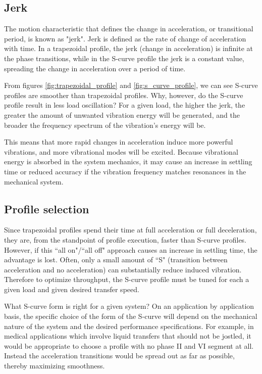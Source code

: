 \subsection{Jerk}

The motion characteristic that defines the change in acceleration, or
transitional period, is known as "jerk". Jerk is defined as the rate of change
of acceleration with time. In a trapezoidal profile, the jerk (change in
acceleration) is infinite at the phase transitions, while in the S-curve profile
the jerk is a constant value, spreading the change in acceleration over a period
of time.

From figures \ref{fig:trapezoidal_profile} and \ref{fig:s_curve_profile}, we can
see S-curve profiles are smoother than trapezoidal profiles. Why, however, do
the S-curve profile result in less load oscillation? For a given load, the
higher the jerk, the greater the amount of unwanted vibration energy will be
generated, and the broader the frequency spectrum of the vibration's energy will
be.

This means that more rapid changes in acceleration induce more powerful
vibrations, and more vibrational modes will be excited. Because vibrational
energy is absorbed in the system mechanics, it may cause an increase in settling
time or reduced accuracy if the vibration frequency matches resonances in the
mechanical system.

\subsection{Profile selection}

Since trapezoidal profiles spend their time at full acceleration or full
deceleration, they are, from the standpoint of profile execution, faster than
S-curve profiles. However, if this ``all on"/``all off" approach causes an
increase in settling time, the advantage is lost. Often, only a small amount of
``S" (transition between acceleration and no acceleration) can substantially
reduce induced vibration. Therefore to optimize throughput, the S-curve profile
must be tuned for each a given load and given desired transfer speed.

What S-curve form is right for a given system? On an application by application
basis, the specific choice of the form of the S-curve will depend on the
mechanical nature of the system and the desired performance specifications. For
example, in medical applications which involve liquid transfers that should not
be jostled, it would be appropriate to choose a profile with no phase II and VI
segment at all. Instead the acceleration transitions would be spread out as far
as possible, thereby maximizing smoothness.

